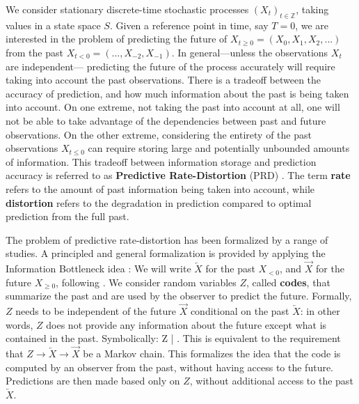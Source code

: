 \documentclass[entropy,article,submit,moreauthors,pdftex,10pt,a4paper]{Definitions/mdpi}
\newcommand{\future}{\overrightarrow{X}}
\newcommand{\past}{\overleftarrow{X}}
\newcommand{\key}{\textbf}
\let\oldequation\equation
\let\oldendequation\endequation
\renewenvironment{equation}
  {\linenomathNonumbers\oldequation}
  {\oldendequation\endlinenomath}
\begin{document}
We consider stationary discrete-time stochastic processes $(X_t)_{t \in \mathbb{Z}}$, taking values in a state space $S$.
Given a reference point in time, say $T=0$, we are interested in the problem of predicting the future of $X_{t\geq 0} = (X_0, X_1, X_2, ...)$ from the past $X_{t< 0} = (..., X_{-2}, X_{-1})$.
In general---unless the observations $X_t$ are independent--- predicting the future of the process accurately will require taking into account the past observations.
There is a tradeoff between the accuracy of prediction, and how much information about the past is being taken into account.
On one extreme, not taking the past into account at all, one will not be able to take advantage of the dependencies between past and future observations.
On the other extreme, considering the entirety of the past observations $X_{t \leq 0}$ can require storing large and potentially unbounded amounts of information.
This tradeoff between information storage and prediction accuracy is referred to as \key{Predictive Rate-Distortion} (PRD) \citep{marzen-predictive-2016}.
The term \key{rate} refers to the amount of past information being taken into account, while \key{distortion} refers to the degradation in prediction compared to optimal prediction from the full past.



The problem of predictive rate-distortion has been formalized by a range of studies.
A principled and general formalization is provided by applying the Information Bottleneck idea \citep{tishby-information-1999, still-optimal-2010,marzen-predictive-2016}:
We will write $\past$ for the past $X_{< 0}$, and $\future$ for the future $X_{\geq 0}$, following \cite{marzen-predictive-2016}.
We consider random variables $Z$, called \key{codes}, that summarize the past and are used by the observer to predict the future.
Formally, $Z$ needs to be independent of the future $\future$ conditional on the past $\past$: in other words, $Z$ does not provide any information about the future except what is contained in the past. Symbolically:
\begin{equation}\label{eq:markov}
	Z \bot \future | \past.
\end{equation}
This is equivalent to the requirement that $Z \rightarrow \past \rightarrow \future$ be a Markov chain.
This formalizes the idea that the code is computed by an observer from the past, without having access to the future.
Predictions are then made based only on $Z$, without additional access to the past $\past$.
\end{document}
